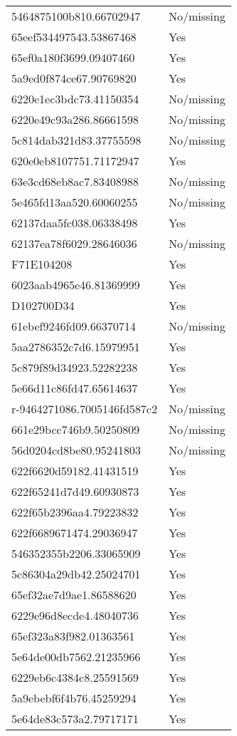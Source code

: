 \begin{tabular}{ll}
5464875100b810.66702947 & No/missing \\
65eef534497543.53867468 & Yes \\
65ef0a180f3699.09407460 & Yes \\
5a9ed0f874ce67.90769820 & Yes \\
6220e1ec3bdc73.41150354 & No/missing \\
6220e49c93a286.86661598 & No/missing \\
5c814dab321d83.37755598 & No/missing \\
620e0eb8107751.71172947 & Yes \\
63e3cd68eb8ac7.83408988 & No/missing \\
5e465fd13aa520.60060255 & No/missing \\
62137daa5fc038.06338498 & Yes \\
62137ea78f6029.28646036 & No/missing \\
F71E104208 & Yes \\
6023aab4965e46.81369999 & Yes \\
D102700D34 & Yes \\
61ebef9246fd09.66370714 & No/missing \\
5aa2786352c7d6.15979951 & Yes \\
5c879f89d34923.52282238 & Yes \\
5e66d11c86fd47.65614637 & Yes \\
r-9464271086.7005146fd587c2 & No/missing \\
661e29bcc746b9.50250809 & No/missing \\
56d0204cd8be80.95241803 & No/missing \\
622f6620d59182.41431519 & Yes \\
622f65241d7d49.60930873 & Yes \\
622f65b2396aa4.79223832 & Yes \\
622f6689671474.29036947 & Yes \\
546352355b2206.33065909 & Yes \\
5c86304a29db42.25024701 & Yes \\
65ef32ae7d9ae1.86588620 & Yes \\
6229e96d8ecde4.48040736 & Yes \\
65ef323a83f982.01363561 & Yes \\
5e64de00db7562.21235966 & Yes \\
6229eb6c4384c8.25591569 & Yes \\
5a9ebebf6f4b76.45259294 & Yes \\
5e64de83c573a2.79717171 & Yes \\

\end{tabular}

